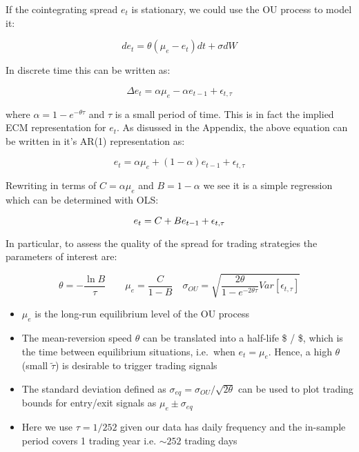 \documentclass{article}
\begin{document}
If the cointegrating spread \(e_t\) is stationary, we could use the OU
process to model it:

\[
d e_t = \theta (\mu_e - e_t) dt + \sigma dW
\]

In discrete time this can be written as:

\[ 
\begin{equation}
\Delta e_t = \alpha \mu_e - \alpha e_{t-1} + \epsilon_{t, \tau}
\end{equation}
\]

where \(\alpha= 1 - e^{-\theta \tau}\) and \(\tau\) is a small period of
time. This is in fact the implied ECM representation for \(e_t\). As
disussed in the Appendix, the above equation can be written in it's
AR(1) representation as:

\[
e_t = \alpha \mu_e + (1-\alpha)e_{t-1} + \epsilon_{t, \tau}
\]

Rewriting in terms of \(C = \alpha \mu_e\) and \(B=1-\alpha\) we see it
is a simple regression which can be determined with OLS:

\[ 
\begin{equation}
e_t = C + B e_{t-1} + \epsilon_{t, \tau} \\
\end{equation}
\]

In particular, to assess the quality of the spread for trading
strategies the parameters of interest are:

\[
\theta = -\frac{\ln B}{\tau} \qquad \mu_e = \frac{C}{1-B} 
\quad \sigma_{OU} = \sqrt{\frac{2 \theta}{1-e^{-2\theta \tau}} Var[\epsilon_{t, \tau}]}
\]

\begin{itemize}
\item
  \(\mu_e\) is the long-run equilibrium level of the OU process
\item
  The mean-reversion speed \(\theta\) can be translated into a half-life
  \$\tilde{\tau} \propto {} / \theta \$, which is the time between
  equilibrium situations, i.e.~when \(e_t = \mu_e\). Hence, a high
  \(\theta\) (small \(\tilde{\tau}\)) is desirable to trigger trading
  signals
\item
  The standard deviation defined as
  \(\sigma_{eq} = \sigma_{OU} / \sqrt{2 \theta}\) can be used to plot
  trading bounds for entry/exit signals as \(\mu_e \pm \sigma_{eq}\)
\item
  Here we use \(\tau = 1/252\) given our data has daily frequency and
  the in-sample period covers 1 trading year i.e. \(\sim 252\) trading
  days
\end{itemize}
\end{document}
